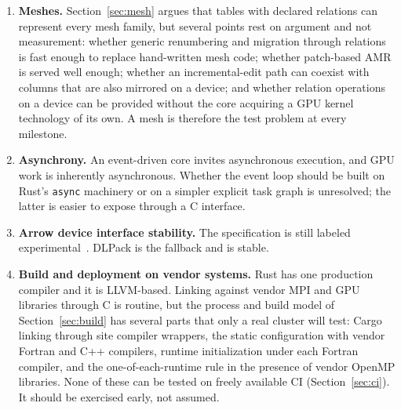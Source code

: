 \documentclass[11pt,a4paper]{article}
\newcommand{\code}[1]{\texttt{#1}}
\begin{document}
\begin{enumerate}
        untried.  A normalized system of units whose scales are computed
        from the parameters of a run exists only once the driver has been
        evaluated, which moves some unit checks from the definition check to
        the driver check.  Conversions between systems of quantities are
        left to packages, and whether packages will supply them
        consistently is unknown.
  \item \label{risk:mesh} \textbf{Meshes.}  Section~\ref{sec:mesh} argues
        that tables with declared relations can represent every mesh family,
        but several points rest on argument and not measurement: whether
        generic renumbering and migration through relations is fast enough to
        replace hand-written mesh code; whether patch-based AMR is served
        well enough; whether an incremental-edit path can coexist with
        columns that are also mirrored on a device; and whether relation
        operations on a device can be provided without the core acquiring a
        GPU kernel technology of its own.  A mesh is therefore the test
        problem at every milestone.
  \item \textbf{Asynchrony.}  An event-driven core invites asynchronous
        execution, and GPU work is inherently asynchronous.  Whether the event
        loop should be built on Rust's \code{async} machinery or on a simpler
        explicit task graph is unresolved; the latter is easier to expose
        through a C interface.
  \item \textbf{Arrow device interface stability.}  The specification is
        still labeled experimental~\cite{arrowcdevice}.  DLPack is the
        fallback and is stable.
  \item \label{risk:build} \textbf{Build and deployment on vendor systems.}
        Rust has one production compiler and it is LLVM-based.  Linking
        against vendor MPI and GPU libraries through C is routine, but the
        process and build model of Section~\ref{sec:build} has several parts
        that only a real cluster will test: Cargo linking through site
        compiler wrappers, the static configuration with vendor Fortran and
        C++ compilers, runtime initialization under each Fortran compiler,
        and the one-of-each-runtime rule in the presence of vendor OpenMP
        libraries.  None of these can be tested on freely available CI
        (Section~\ref{sec:ci}).  It should be exercised early, not assumed.
\end{enumerate}
\end{document}

